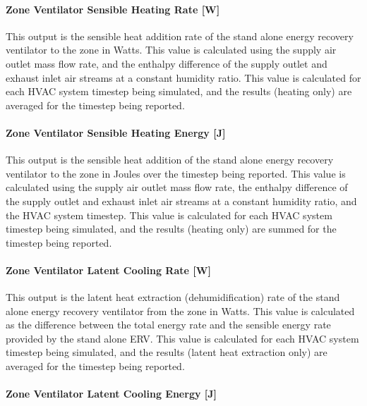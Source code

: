 \paragraph{Zone Ventilator Sensible Heating Rate {[}W{]}}\label{zone-ventilator-sensible-heating-rate-w}

This output is the sensible heat addition rate of the stand alone energy recovery ventilator to the zone in Watts. This value is calculated using the supply air outlet mass flow rate, and the enthalpy difference of the supply outlet and exhaust inlet air streams at a constant humidity ratio. This value is calculated for each HVAC system timestep being simulated, and the results (heating only) are averaged for the timestep being reported.

\paragraph{Zone Ventilator Sensible Heating Energy {[}J{]}}\label{zone-ventilator-sensible-heating-energy-j}

This output is the sensible heat addition of the stand alone energy recovery ventilator to the zone in Joules over the timestep being reported. This value is calculated using the supply air outlet mass flow rate, the enthalpy difference of the supply outlet and exhaust inlet air streams at a constant humidity ratio, and the HVAC system timestep. This value is calculated for each HVAC system timestep being simulated, and the results (heating only) are summed for the timestep being reported.

\paragraph{Zone Ventilator Latent Cooling Rate {[}W{]}}\label{zone-ventilator-latent-cooling-rate-w}

This output is the latent heat extraction (dehumidification) rate of the stand alone energy recovery ventilator from the zone in Watts. This value is calculated as the difference between the total energy rate and the sensible energy rate provided by the stand alone ERV. This value is calculated for each HVAC system timestep being simulated, and the results (latent heat extraction only) are averaged for the timestep being reported.

\paragraph{Zone Ventilator Latent Cooling Energy {[}J{]}}\label{zone-ventilator-latent-cooling-energy-j}

